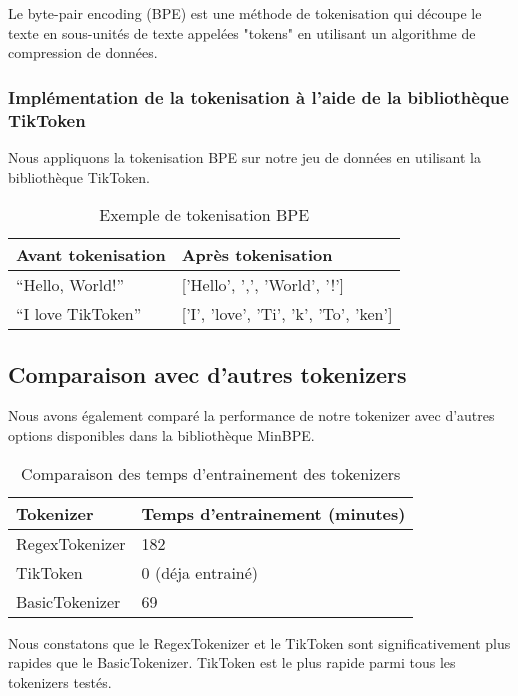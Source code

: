 Le byte-pair encoding (BPE) est une méthode de tokenisation qui découpe le texte en sous-unités de texte appelées "tokens" en utilisant un algorithme de compression de données.

\subsubsection*{Implémentation de la tokenisation à l'aide de la bibliothèque TikToken}

Nous appliquons la tokenisation BPE sur notre jeu de données en utilisant la bibliothèque TikToken.

\begin{table}[h]
\centering
\begin{tabular}{|l|l|}
\hline
\textbf{Avant tokenisation} & \textbf{Après tokenisation} \\ \hline
``Hello, World!'' & ['Hello', ',', 'World', '!'] \\ \hline
``I love TikToken'' & ['I', 'love', 'Ti', 'k', 'To', 'ken'] \\ \hline
\end{tabular}
\caption{Exemple de tokenisation BPE}
\end{table}

\subsection{Comparaison avec d'autres tokenizers}

Nous avons également comparé la performance de notre tokenizer avec d'autres options disponibles dans la bibliothèque MinBPE.

\begin{table}[h]
\centering
\begin{tabular}{|l|l|}
\hline
\textbf{Tokenizer} & \textbf{Temps d'entrainement (minutes)} \\ \hline
RegexTokenizer & 182 \\ \hline
TikToken & 0 (déja entrainé) \\ \hline
BasicTokenizer & 69 \\ \hline
\end{tabular}
\caption{Comparaison des temps d'entrainement des tokenizers}
\end{table}


Nous constatons que le RegexTokenizer et le TikToken sont significativement plus rapides que le BasicTokenizer. TikToken est le plus rapide parmi tous les tokenizers testés.

